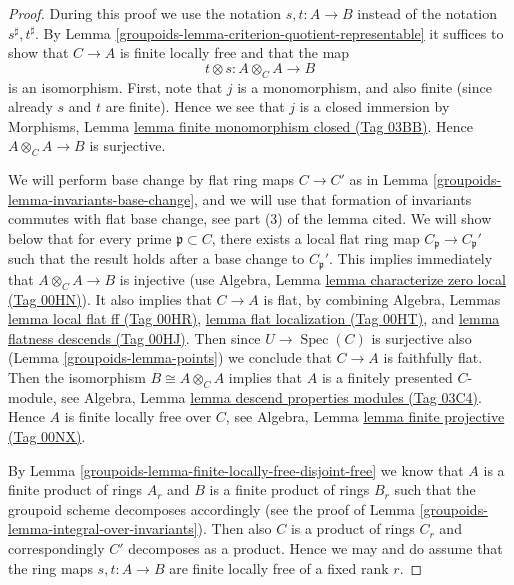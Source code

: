 \documentclass{amsart}
\theoremstyle{plain}
\theoremstyle{definition}
\theoremstyle{remark}
\numberwithin{equation}{subsection}
\def\Spec{\mathop{\mathrm{Spec}}}
\begin{document}
\begin{proof}
During this proof we use the notation $s, t : A \to B$
instead of the notation $s^\sharp, t^\sharp$.
By Lemma \ref{groupoids-lemma-criterion-quotient-representable}
it suffices to show that $C \to A$ is finite locally free
and that the map
$$
t \otimes s : A \otimes_C A \longrightarrow B
$$
is an isomorphism. First, note that $j$ is a monomorphism, and
also finite (since already $s$ and $t$ are finite). Hence we see
that $j$ is a closed immersion by
Morphisms, Lemma \href{https://stacks.math.columbia.edu/tag/03BB}{lemma finite monomorphism closed (Tag 03BB)}.
Hence $A \otimes_C A \to B$ is surjective.

\medskip\noindent
We will perform base change by flat ring maps $C \to C'$ as in
Lemma \ref{groupoids-lemma-invariants-base-change}, and we will use that
formation of invariants commutes with flat base change, see
part (3) of the lemma cited.
We will show below that for every prime $\mathfrak p \subset C$, there exists
a local flat ring map $C_{\mathfrak p} \to C_{\mathfrak p}'$
such that the result holds after a base change to $C_{\mathfrak p}'$.
This implies immediately
that $A \otimes_C A \to B$ is injective (use
Algebra, Lemma \href{https://stacks.math.columbia.edu/tag/00HN}{lemma characterize zero local (Tag 00HN)}).
It also implies that $C \to A$ is flat, by combining
Algebra, Lemmas \href{https://stacks.math.columbia.edu/tag/00HR}{lemma local flat ff (Tag 00HR)},
\href{https://stacks.math.columbia.edu/tag/00HT}{lemma flat localization (Tag 00HT)}, and
\href{https://stacks.math.columbia.edu/tag/00HJ}{lemma flatness descends (Tag 00HJ)}. Then since $U \to \Spec(C)$
is surjective also (Lemma \ref{groupoids-lemma-points}) we conclude that $C \to A$
is faithfully flat. Then the isomorphism $B \cong A \otimes_C A$
implies that $A$ is a finitely presented $C$-module, see
Algebra, Lemma \href{https://stacks.math.columbia.edu/tag/03C4}{lemma descend properties modules (Tag 03C4)}.
Hence $A$ is finite locally free over $C$, see
Algebra, Lemma \href{https://stacks.math.columbia.edu/tag/00NX}{lemma finite projective (Tag 00NX)}.

\medskip\noindent
By Lemma \ref{groupoids-lemma-finite-locally-free-disjoint-free}
we know that $A$ is a finite
product of rings $A_r$ and $B$ is a finite product of rings $B_r$
such that the groupoid scheme decomposes accordingly (see the proof
of Lemma \ref{groupoids-lemma-integral-over-invariants}).
Then also $C$ is a product of rings $C_r$ and
correspondingly $C'$ decomposes as a product. Hence we may and do
assume that the ring maps $s, t : A \to B$ are finite
locally free of a fixed rank $r$.


\end{proof}
\end{document}
